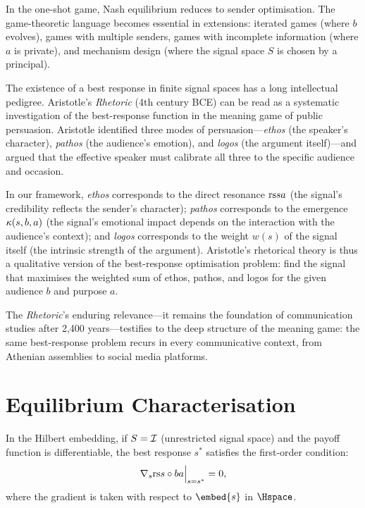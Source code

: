 \begin{remark}
In the one-shot game, Nash equilibrium reduces to sender optimisation.  The
game-theoretic language becomes essential in extensions: iterated games
(where $b$ evolves), games with multiple senders, games with incomplete
information (where $a$ is private), and mechanism design (where the signal
space $S$ is chosen by a principal).
\end{remark}

\begin{interpretation}
\label{interp:ch14:br_existence_rhetoric}
The existence of a best response in finite signal spaces has a long
intellectual pedigree.  Aristotle's \emph{Rhetoric} (4th century BCE)
can be read as a systematic investigation of the best-response function
in the meaning game of public persuasion.  Aristotle identified three modes
of persuasion---\emph{ethos} (the speaker's character), \emph{pathos}
(the audience's emotion), and \emph{logos} (the argument itself)---and
argued that the effective speaker must calibrate all three to the specific
audience and occasion.

In our framework, \emph{ethos} corresponds to the direct resonance
$\mathrm{rs}{s}{a}$ (the signal's credibility reflects the sender's character);
\emph{pathos} corresponds to the emergence $\kappa(s, b, a)$ (the signal's
emotional impact depends on the interaction with the audience's context);
and \emph{logos} corresponds to the weight $w(s)$ of the signal itself
(the intrinsic strength of the argument).  Aristotle's rhetorical theory
is thus a qualitative version of the best-response optimisation problem:
find the signal that maximises the weighted sum of ethos, pathos, and logos
for the given audience $b$ and purpose $a$.

The \emph{Rhetoric}'s enduring relevance---it remains the foundation of
communication studies after 2,400 years---testifies to the deep structure
of the meaning game: the same best-response problem recurs in every
communicative context, from Athenian assemblies to social media platforms.
\end{interpretation}



\section{Equilibrium Characterisation}

\begin{theorem}
\label{thm:foc}
In the Hilbert embedding, if $S = \mathcal{I}$ (unrestricted signal space) and the
payoff function is differentiable, the best response $s^*$ satisfies the
first-order condition:
\[
  \nabla_s \mathrm{rs}{s \circ b}{a}\Big|_{s = s^*} = 0,
\]
where the gradient is taken with respect to $\embed{s}$ in $\Hspace$.
\end{theorem}

